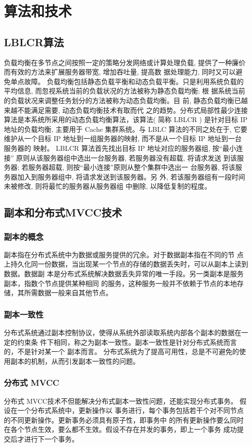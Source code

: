 \section{算法和技术}
\subsection{LBLCR算法}
负载均衡在多节点之间按照一定的策略分发网络或计算处理负载,
提供了一种廉价而有效的方法来扩展服务器带宽, 增加吞吐量, 提高数
据处理能力, 同时又可以避免单点故障。
负载均衡包括静态负载平衡和动态负载平衡。只是利用系统负载的
平均信息, 而忽视系统当前的负载状况的方法被称为静态负载均衡; 根
据系统当前的负载状况来调整任务划分的方法被称为动态负载均衡。目
前, 静态负载均衡已越来越不能满足需要, 动态负载均衡技术有取而代
之的趋势。分布式局部性最少连接算法是本系统所采用的动态负载均衡算法，该算法( 简称 LBLCR ) 是针对目标 IP 地址的负载均衡, 主要用于
Cache 集群系统。与 LBLC 算法的不同之处在于, 它要维护从一个目标 IP
地址到一组服务器的映射, 而不是从一个目标 IP 地址到一台服务器的
映射。
LBLCR 算法首先找出目标 IP 地址对应的服务器组, 按“最小连接”
原则从该服务器组中选出一台服务器, 若服务器没有超载, 将请求发送
到该服务器; 若服务器超载, 则按“最小连接”原则从整个集群中选出一
台服务器, 将该服务器加入到服务器组中, 将请求发送到该服务器。另
外, 若该服务器组有一段时间未被修改, 则将最忙的服务器从服务器组
中删除, 以降低复制的程度。
\subsection{副本和分布式MVCC技术}
\subsubsection{副本的概念}
副本指在分布式系统中为数据或服务提供的冗余。对于数据副本指在不同的节
点上持久化同一份数据，当出现某一个节点的存储的数据丢失时，可以从副本上读到数据。数据副
本是分布式系统解决数据丢失异常的唯一手段。另一类副本是服务副本，指数个节点提供某种相同
的服务，这种服务一般并不依赖于节点的本地存储，其所需数据一般来自其他节点。
\subsubsection{副本一致性}
分布式系统通过副本控制协议，使得从系统外部读取系统内部各个副本的数据在一定的约束条
件下相同，称之为副本一致性。副本一致性是针对分布式系统而言的，不是针对某一个
副本而言。
分布式系统为了提高可用性，总是不可避免的使用副本的机制，从而引发副本一致性的问题。
\subsubsection{分布式 MVCC}
分布式 MVCC技术不但能解决分布式副本一致性问题，还能实现分布式事务。
假设在一个分布式系统中，更新操作以
事务进行，每个事务包括若干个对不同节点的不同更新操作。更新事务必须具有原子性，即事务中
的所有更新操作要么同时在各个节点生效，要么都不生效。假设不存在并发的事务，即上一个事务
成功提交后才进行下一个事务。

